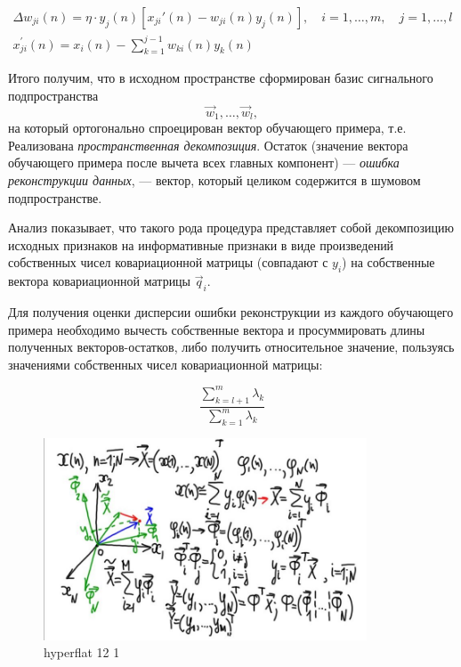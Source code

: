 \documentclass{article}
\numberwithin{equation}{subsection}
\begin{document}
\begin{align}
    \Delta w_{ji}(n) = \eta \cdot y_j(n) 
    \left[
        x_{ji}'(n) - w_{ji}(n) y_j(n)
    \right], \quad i = 1, \dots, m,\quad j=1, \dots, l \\
    x_{ji}^\prime (n) = x_i(n) - \sum_{k=1}^{j-1} w_{ki} (n) y_k (n)
\end{align}

Итого получим, что в исходном пространстве сформирован базис сигнального подпространства
\begin{equation*}
    \vec{w}_1, \dots, \vec{w}_l,
\end{equation*}
\noindent
на который ортогонально спроецирован вектор обучающего примера, т.е. Реализована 
\textit{пространственная декомпозиция}.
Остаток (значение вектора обучающего примера после вычета всех главных компонент)
--- \textit{ошибка реконструкции данных}, --- вектор, который целиком содержится 
в шумовом подпространстве.

Анализ показывает, что такого рода процедура представляет собой декомпозицию исходных
признаков на информативные признаки в виде произведений собственных чисел ковариационной матрицы
(совпадают с $y_i$) на собственные вектора ковариационной матрицы $\vec{q}_i$.

Для получения оценки дисперсии ошибки реконструкции из каждого обучающего примера необходимо 
вычесть собственные вектора и просуммировать длины полученных векторов-остатков, либо
получить относительное значение, пользуясь значениями собственных чисел ковариационной матрицы:

\begin{equation}
    \dfrac{\sum_{k=l+1}^m \lambda_k}{\sum_{k=1}^m \lambda_k}
\end{equation}

\begin{figure}[htbp]
    \centering
    \includegraphics[height=6cm]{hyperflat_12_1.jpeg}
    \caption{hyperflat 12 1}
    \label{hyperflat_12_1}
\end{figure}
\end{document}
